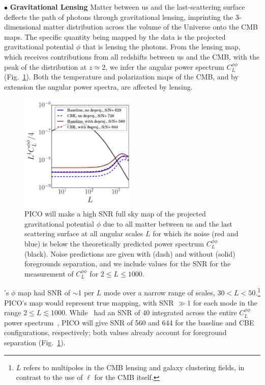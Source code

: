 \documentclass[PICOReport.tex]{subfiles}
\begin{document}
\noindent$\bullet$ {\bf Gravitational Lensing} \hspace{0.1in} \label{lensing} Matter between us and the last-scattering surface deflects the path of photons through gravitational lensing, imprinting the 3-dimensional matter distribution across the volume of the Universe onto the CMB maps. The specific quantity being mapped by the data is the projected gravitational potential $\phi$ that is lensing the photons. From the lensing map, which receives contributions from all redshifts between us and the CMB, with the peak of the distribution at $z \simeq 2$, we infer the angular power spectrum $C_{L}^{\phi \phi}$ (Fig.~\ref{fig:lensingNoisePICO}). Both the temperature and polarization maps of the CMB, and by extension the angular power spectra, are affected by lensing. 
\begin{figure}[h]
\hspace{-0.2in}
\parbox{3.0in}{\centerline {
\includegraphics[width=2.2in]{images/lensingNoisePICO.pdf} } }
\hspace{0.in}
\parbox{3.3in}{
\caption{\captiontext 
PICO will make a high \ac{SNR} full sky map of the projected gravitational potential $\phi$ due to all matter between us and the last scattering surface at all angular scales $L$ for which its noise (red and blue) is below the 
theoretically predicted power spectrum $C_{L}^{\phi \phi}$ (black). Noise predictions are given with (dash) and without (solid) foregrounds separation, and we include values for the \ac{SNR} for the measurement of $C_{L}^{\phi \phi}$ for 
$2 \leq L \leq 1000$. 
\label{fig:lensingNoisePICO} 
} }
\vspace{-0.1in}
\end{figure}

\planck 's $\phi$ map had \ac{SNR} of $\sim$1 per $L$ mode over a narrow range of scales, $30 < L < 50$.\footnote{$L$ refers to multipoles in the CMB lensing and galaxy clustering fields, in contrast to the use of $\ell$  for the CMB itself. } PICO's map would represent true mapping, with \ac{SNR} $\gg1$ for each mode in the range $2 \leq L \lesssim 1000$.  While \planck\ had an \ac{SNR} of 40 integrated across the entire $C_{L}^{\phi \phi}$ power spectrum~\citep{2018arXiv180706210P}, PICO will give \ac{SNR} of 560 and 644 for the baseline and CBE configurations, respectively; both values already account for foreground separation (Fig.~\ref{fig:lensingNoisePICO}). 
\end{document}
